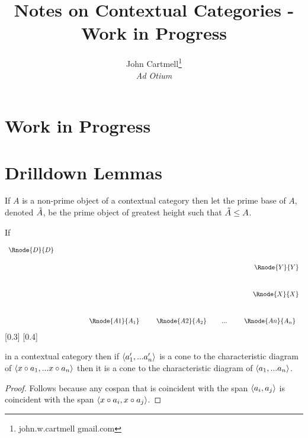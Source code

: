 \documentclass[10pt,a4paper]{scrartcl}
\title{Notes on Contextual Categories - Work in Progress}
\author{John Cartmell\footnote{john.w.cartmell gmail.com}\\ \normalsize{\textit{Ad Otium}}}
\begin{document}
\maketitle


\section{Work in Progress}



\section{Drilldown Lemmas}
\begin{definition}
If $A$ is a non-prime object of a contextual category \ccat then let the prime base of $A$, denoted $\tilde{A}$,  be the 
prime object of \ccat greatest height such that $\tilde{A} \leq A$.
\end{definition}

\begin{lemma}
If 
\begin{center}
\begin{displaymath}
\begin{array}{c p{1cm} r  }
\Rnode{D}{D} \\[0.5cm]
&&\Rnode{Y}{Y}\\[1.0cm]
&&\Rnode{X}{X}\\[1.0cm]
&&\begin{array}{c p{0.2cm} c p{0.1cm}c p{0.2cm} c}
\Rnode{A1}{A_1}& & \Rnode{A2}{A_2}&   & ... & & \Rnode{An}{A_n}
\end{array}                             
\end{array} 
\end{displaymath}
[0.3]
[0.4]
\end{center}
in a contextual category \ccat then if $\langle a'_1,...a'_n\rangle$ is a cone to the characteristic diagram 
of $\langle x \circ a_1,... x \circ a_n\rangle$ then it is a cone to the characteristic diagram
of $\langle a_1,... a_n\rangle$.
\end{lemma}
\begin{proof}
Follows because any cospan that is coincident with the span $\langle a_i,a_j\rangle$
is coincident with the span $\langle x \circ a_i, x \circ a_j\rangle$.
\end{proof}
\end{document}
